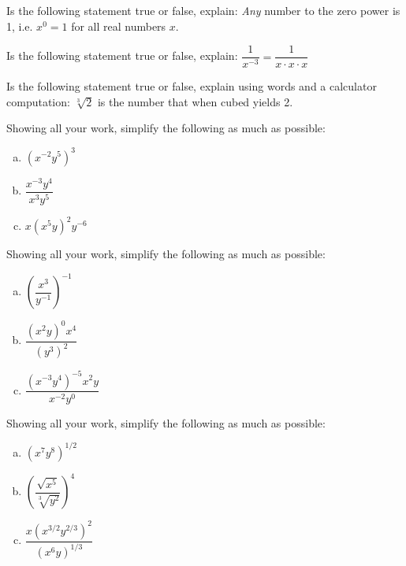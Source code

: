 \documentclass[11pt,letterpaper]{article}
\begin{document}

 Is the following statement true or false, explain: \textit{Any} number to the zero power is 1, i.e. $x^0= 1$ for all real numbers $x$. 



\newpage



 Is the following statement true or false, explain: $\dfrac{1}{x^{-3}}= \dfrac{1}{x \cdot x \cdot x}$



\newpage



 Is the following statement true or false, explain using words and a calculator computation: $\sqrt[3]{2}$ is the number that when cubed yields 2. 



\newpage



 Showing all your work, simplify the following as much as possible:
        \begin{enumerate}[(a)]
        \item $(x^{-2} y^5)^3$
        \item $\dfrac{x^{-3}y^4}{x^3y^5}$
        \item $x(x^5y)^2y^{-6}$
        \end{enumerate}



\newpage



 Showing all your work, simplify the following as much as possible:
        \begin{enumerate}[(a)]
        \item $\left( \dfrac{x^3}{y^{-1}} \right)^{-1}$
        \item $\dfrac{(x^2y)^0 x^4}{(y^3)^2}$
        \item $\dfrac{(x^{-3} y^4)^{-5} x^2y}{x^{-2} y^0}$
        \end{enumerate}



\newpage



 Showing all your work, simplify the following as much as possible:
        \begin{enumerate}[(a)]
        \item $(x^7 y^8)^{1/2}$
        \item $\left( \dfrac{\sqrt{x^5}}{\sqrt[3]{y^2}} \right)^4$
        \item $\dfrac{x(x^{3/2}y^{2/3})^2}{(x^6 y)^{1/3}}$
        \end{enumerate}
\end{document}
